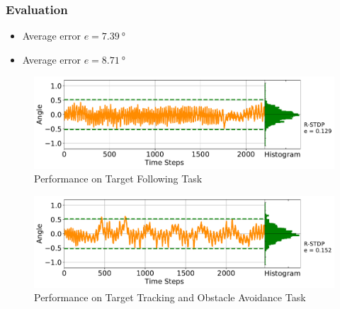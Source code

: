 \begin{frame}
	\frametitle{Evaluation}
	\begin{itemize}
		\item <1-> Average error $ e = \SI{7,39}{\degree}$
		\item <2-> Average error $ e = \SI{8.71}{\degree}$
	\end{itemize}
	\begin{overprint}
		\begin{figure}
			\centering
			\includegraphics[width=\textwidth]{img/performance_tf.pdf}
			\caption{Performance on Target Following Task}
			\label{fig:Performance_tf}
		\end{figure}
		\begin{figure}
			\centering
			\includegraphics[width=\textwidth]{img/performance_oa.pdf}
			\caption{Performance on Target Tracking and Obstacle Avoidance Task}
			\label{fig:Performance_oa}
		\end{figure}
	\end{overprint}
\end{frame}
